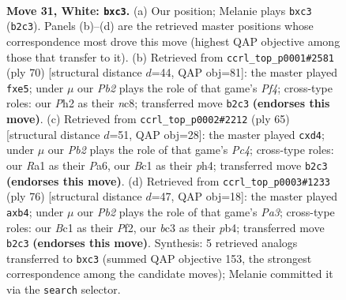 \documentclass[11pt]{article}
\begin{document}
\clearpage

\begin{figure}[p]\centering
\begin{subfigure}{0.46\textwidth}\centering
\resizebox{\linewidth}{!}{%
\newchessgame
\chessboard[
  setfen={r7/3n1k2/8/8/p1p1p2p/P1b5/1PP2PPP/R1BK4 w - - 0 31},
  showmover=false,
  pgfstyle=straightmove, color=movearrow, markmove={b2-c3}
]}
\caption{}
\end{subfigure}\hfill
\begin{subfigure}{0.46\textwidth}\centering
\resizebox{\linewidth}{!}{%
\newchessgame
\chessboard[
  setfen={1rn1k3/2p5/2p1p1p1/4b2p/3PPP1P/3K4/3B1P2/R7 w - - 0 36},
  showmover=false,
  pgfstyle=straightmove, color=movearrow, markmove={f4-e5}
]}
\caption{}
\end{subfigure}
\\[4pt]
\begin{subfigure}{0.46\textwidth}\centering
\resizebox{\linewidth}{!}{%
\newchessgame
\chessboard[
  setfen={1r4k1/3p1pp1/p3p3/2p1P3/P1PB1P1P/6R1/6P1/4K3 b - - 0 33},
  showmover=false,
  pgfstyle=straightmove, color=movearrow, markmove={c5-d4}
]}
\caption{}
\end{subfigure}\hfill
\begin{subfigure}{0.46\textwidth}\centering
\resizebox{\linewidth}{!}{%
\newchessgame
\chessboard[
  setfen={1r6/2p1k3/2P1b3/1p2p3/1p2B1p1/P3P1P1/3RKP2/8 w - - 0 39},
  showmover=false,
  pgfstyle=straightmove, color=movearrow, markmove={a3-b4}
]}
\caption{}
\end{subfigure}
\caption{\textbf{Move 31, White: \texttt{bxc3}.} (a) Our position; Melanie plays \texttt{bxc3} (\texttt{b2c3}). Panels (b)--(d) are the retrieved master positions whose correspondence most drove this move (highest QAP objective among those that transfer to it). (b) Retrieved from \texttt{ccrl\_top\_p0001\#2581} (ply 70) [structural distance $d$=44, QAP obj=81]: the master played \texttt{fxe5}; under $\mu$ our \emph{Pb2} plays the role of that game's \emph{Pf4}; cross-type roles: our \emph{P}h2 as their \emph{n}c8; transferred move \texttt{b2c3} \textbf{(endorses this move)}. (c) Retrieved from \texttt{ccrl\_top\_p0002\#2212} (ply 65) [structural distance $d$=51, QAP obj=28]: the master played \texttt{cxd4}; under $\mu$ our \emph{Pb2} plays the role of that game's \emph{Pc4}; cross-type roles: our \emph{R}a1 as their \emph{P}a6, our \emph{B}c1 as their \emph{p}h4; transferred move \texttt{b2c3} \textbf{(endorses this move)}. (d) Retrieved from \texttt{ccrl\_top\_p0003\#1233} (ply 76) [structural distance $d$=47, QAP obj=18]: the master played \texttt{axb4}; under $\mu$ our \emph{Pb2} plays the role of that game's \emph{Pa3}; cross-type roles: our \emph{B}c1 as their \emph{P}f2, our \emph{b}c3 as their \emph{p}b4; transferred move \texttt{b2c3} \textbf{(endorses this move)}. Synthesis: 5 retrieved analogs transferred to \texttt{bxc3} (summed QAP objective 153, the strongest correspondence among the candidate moves); Melanie committed it via the \texttt{search} selector.}
\label{fig:thought-m60}
\end{figure}
\end{document}
